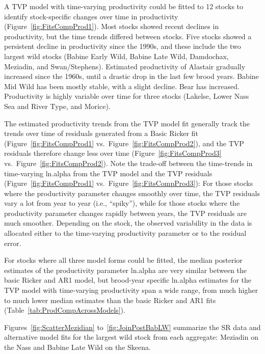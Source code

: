 \documentclass[french,11pt]{book}
\begin{document}
A TVP model with time-varying productivity could be fitted to 12 stocks to identify stock-specific changes over time in productivity (Figure~\ref{fig:FitsCompProd1}). Most stocks showed recent declines in productivity, but the time trends differed between stocks. Five stocks showed a persistent decline in productivity since the 1990s, and these include the two largest wild stocks (Babine Early Wild, Babine Late Wild, Damdochax, Meziadin, and Swan/Stephens). Estimated productivity of Alastair gradually increased since the 1960s, until a drastic drop in the last few brood years. Babine Mid Wild has been mostly stable, with a slight decline. Bear has increased. Productivity is highly variable over time for three stocks (Lakelse, Lower Nass Sea and River Type, and Morice).

The estimated productivity trends from the TVP model fit generally track the trends over time of residuals generated from a Basic Ricker fit (Figure~\ref{fig:FitsCompProd1} vs.~Figure~\ref{fig:FitsCompProd2}), and the TVP residuals therefore change less over time (Figure~\ref{fig:FitsCompProd3} vs.~Figure~\ref{fig:FitsCompProd2}). Note the trade-off between the time-trends in time-varying ln.alpha from the TVP model and the TVP residuals (Figure~\ref{fig:FitsCompProd1} vs.~Figure~\ref{fig:FitsCompProd3}): For those stocks where the productivity parameter changes smoothly over time, the TVP residuals vary a lot from year to year (i.e., ``spiky''), while for those stocks where the productivity parameter changes rapidly between years, the TVP residuals are much smoother. Depending on the stock, the observed variability in the data is allocated either to the time-varying productivity parameter or to the residual error.

For stocks where all three model forms could be fitted, the median posterior estimates of the productivity parameter ln.alpha are very similar between the basic Ricker and AR1 model, but brood-year specific ln.alpha estimates for the TVP model with time-varying productivity span a wide range, from much higher to much lower median estimates than the basic Ricker and AR1 fits (Table~\ref{tab:ProdCompAcrossModels}).

Figures~\ref{fig:ScatterMezidian} to~\ref{fig:JoinPostBabLW} summarize the SR data and alternative model fits for the largest wild stock from each aggregate: Meziadin on the Nass and Babine Late Wild on the Skeena.

\clearpage
\end{document}
